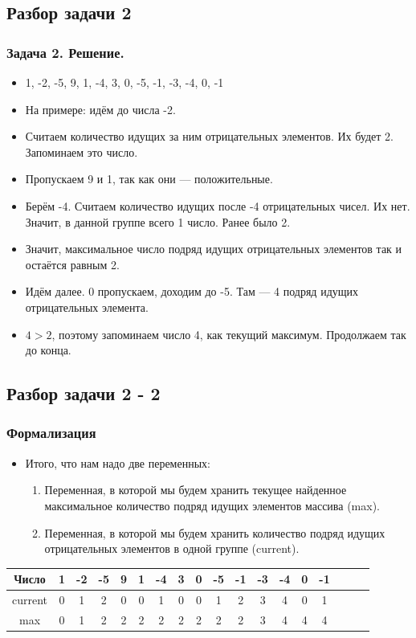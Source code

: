 \documentclass[compress,red]{beamer}
\begin{document}
\subsection{Разбор задачи 2}
\begin{frame}[fragile]
  \frametitle{Задача 2. Решение.}
  \begin{itemize}
    \item 1, -2, -5, 9, 1, -4, 3, 0, -5, -1, -3, -4, 0, -1
    \item На примере: идём до числа -2.
    \item Считаем количество идущих за ним отрицательных элементов. Их будет 2. Запоминаем это число.
    \item Пропускаем 9 и 1, так как они --- положительные.
    \item Берём -4. Считаем количество идущих после -4 отрицательных чисел. Их нет. Значит, в данной группе всего 1 число. Ранее было 2. 
    \item Значит, максимальное число подряд идущих отрицательных элементов так и остаётся равным 2.
    \item Идём далее. 0 пропускаем, доходим до -5. Там --- 4 подряд идущих отрицательных элемента.
    \item $4>2$, поэтому запоминаем число 4, как текущий максимум. Продолжаем так до конца.
  \end{itemize}
\end{frame}

\subsection{Разбор задачи 2 - 2}
\begin{frame}[fragile]
  \frametitle{Формализация}
  \begin{itemize}
    \item Итого, что нам надо две переменных:
      \begin{enumerate}
        \item Переменная, в которой мы будем хранить текущее найденное максимальное количество подряд идущих элементов массива (max).
        \item Переменная, в которой мы будем хранить количество подряд идущих отрицательных элементов в одной группе (current).
      \end{enumerate}
  \end{itemize}
  
  
  \begin{tabular}{|c|c|c|c|c|c|c|c|c|c|c|c|c|c|c|c|c|c|}
    \hline
    Число   & 1 & -2 & -5 & 9 & 1 & -4 & 3 & 0 & -5 & -1 & -3 & -4 & 0 & -1 \\ \hline
    current & 0 & 1 & 2 & 0 & 0 & 1 & 0 & 0 & 1 & 2 & 3 & 4 & 0 & 1 \\ \hline
    max     & 0 & 1 & 2 & 2 & 2 & 2 & 2 & 2 & 2 & 2 & 3 & 4 & 4 & 4 \\ \hline
  \end{tabular}
  
\end{frame}
\end{document}
